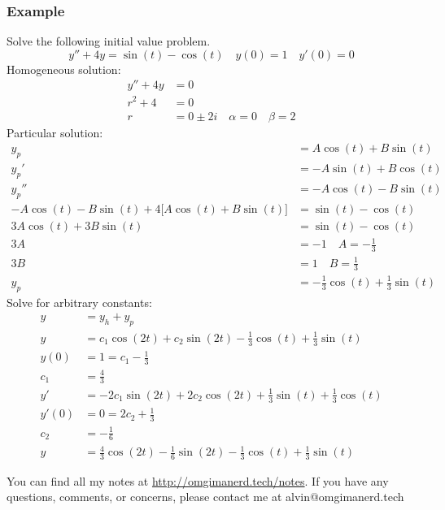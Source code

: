 \documentclass{math}
\begin{document}
\subsubsection*{Example}
Solve the following initial value problem.
\[ y''+4y = \sin(t)-\cos(t) \quad y(0) = 1 \quad y'(0) = 0 \]
Homogeneous solution:
\begin{align*}
  y''+4y &= 0 \\
  r^2+4 &= 0 \\
  r &= 0\pm2i \quad \alpha = 0 \quad \beta = 2
\end{align*}
Particular solution:
\begin{align*}
  y_p &= A\cos(t)+B\sin(t) \\
  y_p' &= -A\sin(t)+B\cos(t) \\
  y_p'' &= -A\cos(t)-B\sin(t) \\
  -A\cos(t)-B\sin(t)+4\bigg[A\cos(t)+B\sin(t)\bigg] &= \sin(t)-\cos(t) \\
  3A\cos(t)+3B\sin(t) &= \sin(t)-\cos(t) \\
  3A &= -1 \quad A = -\frac{1}{3} \\
  3B &= 1 \quad B = \frac{1}{3} \\
  y_p &= -\frac{1}{3}\cos(t)+\frac{1}{3}\sin(t)
\end{align*}
Solve for arbitrary constants:
\begin{align*}
  y &= y_h+y_p \\
  y &= c_1\cos(2t)+c_2\sin(2t)-\frac{1}{3}\cos(t)+\frac{1}{3}\sin(t) \\
  y(0) &= 1 = c_1-\frac{1}{3} \\
  c_1 &= \frac{4}{3} \\
  y' &= -2c_1\sin(2t)+2c_2\cos(2t)+\frac{1}{3}\sin(t)+\frac{1}{3}\cos(t) \\
  y'(0) &= 0 = 2c_2+\frac{1}{3} \\
  c_2 &= -\frac{1}{6} \\
  y &= \frac{4}{3}\cos(2t)-\frac{1}{6}\sin(2t)-\frac{1}{3}\cos(t)+
    \frac{1}{3}\sin(t)
\end{align*}

\begin{center}
  You can find all my notes at \url{http://omgimanerd.tech/notes}. If you have
  any questions, comments, or concerns, please contact me at
  alvin@omgimanerd.tech
\end{center}
\end{document}
